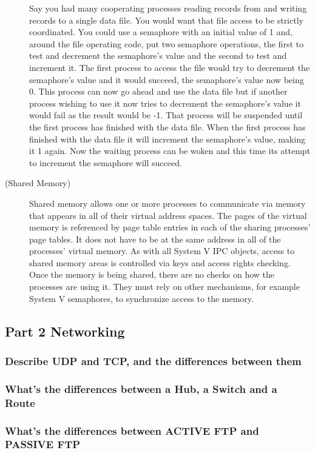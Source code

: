 \documentclass{article}
\begin{document}
\begin{description}
Say you had many cooperating processes reading records from and writing records to a single data file. You would want that file access to be strictly coordinated. You could use a semaphore with an initial value of 1 and, around the file operating code, put two semaphore operations, the first to test and decrement the semaphore's value and the second to test and increment it. The first process to access the file would try to decrement the semaphore's value and it would succeed, the semaphore's value now being 0. This process can now go ahead and use the data file but if another process wishing to use it now tries to decrement the semaphore's value it would fail as the result would be -1. That process will be suspended until the first process has finished with the data file. When the first process has finished with the data file it will increment the semaphore's value, making it 1 again. Now the waiting process can be woken and this time its attempt to increment the semaphore will succeed.
\item[(Shared Memory)] Shared memory allows one or more processes to communicate via memory that appears in all of their virtual address spaces. The pages of the virtual memory is referenced by page table entries in each of the sharing processes' page tables. It does not have to be at the same address in all of the processes' virtual memory. As with all System V IPC objects, access to shared memory areas is controlled via keys and access rights checking. Once the memory is being shared, there are no checks on how the processes are using it. They must rely on other mechanisms, for example System V semaphores, to synchronize access to the memory.
\end{description}

\subsection{Part 2 Networking}
\subsubsection{Describe UDP and TCP, and the differences between them}

\subsubsection{What's the differences between a Hub, a Switch and a Route}

\subsubsection{What's the differences between ACTIVE FTP and PASSIVE FTP}
\end{document}
